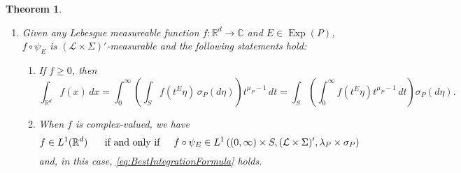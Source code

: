 \documentclass[11pt]{article}
\newtheorem{theorem}{Theorem}[section]
\newcommand\Exp{\operatorname{Exp}}
\begin{document}
\begin{theorem}
\begin{enumerate}
\begin{equation*}
\end{equation*}
and, for each $A\in\mathcal{M}_d$,
\begin{equation*}
m(A)=(\lambda_P\times\sigma_P)(\psi_E^{-1}(A)).
\end{equation*}
\item\label{property:BestIntegrationFormula} Given any Lebesgue measureable function $f:\mathbb{R}^d\to\mathbb{C}$ and $E\in \Exp(P)$, $f\circ \psi_E$ is $(\mathcal{L}\times\Sigma)'$-measurable and the following statements hold:
\begin{enumerate}
\item If $f\geq 0$, then
\begin{equation}\label{eq:BestIntegrationFormula}
\int_{\mathbb{R}^d}f(x)\,dx=\int_0^\infty\left(\int_S f(t^E\eta)\,\sigma_P(d\eta)\right)t^{\mu_P-1}\,dt=\int_S\left(\int_0^\infty f(t^E\eta)t^{\mu_P-1}\,dt\right)\sigma_P(d\eta).
\end{equation}
\item When $f$ is complex-valued, we have 
\begin{equation*}f\in L^1(\mathbb{R}^d)\hspace{.5cm}\mbox{ if and only if}\hspace{.5cm}f\circ\psi_E\in L^1\left((0,\infty)\times S,(\mathcal{L}\times\Sigma)',\lambda_P\times\sigma_P\right)
\end{equation*} 
and, in this case, \eqref{eq:BestIntegrationFormula} holds.
\end{enumerate}
\end{enumerate}
\end{theorem}
\end{document}
